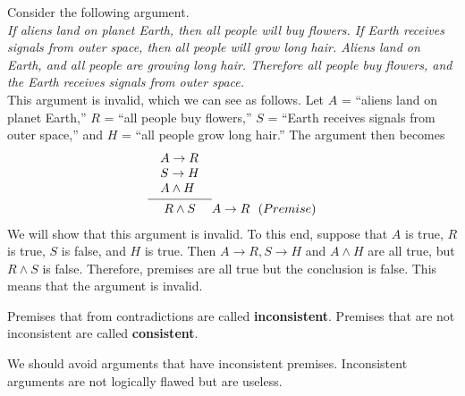\documentclass[]{article}
\begin{document}
\begin{exmp}
Consider the following argument.\\
\emph{
If aliens land on planet Earth, then all people will buy flowers. If Earth receives signals from outer space, then all people will grow long hair. Aliens land on Earth, and all people are growing long hair. Therefore all people buy flowers, and the Earth receives signals from outer space.}\\
			This argument is invalid, which we can see as follows. Let $A$ = ``aliens land on planet Earth,'' $R$ = ``all people buy flowers,'' $S$ = ``Earth receives signals from outer space,'' and $H$ = ``all people grow long hair.'' The argument then becomes
\begin{equation*}
\infer{\begin{array}{@{}llr@{}llr@{}llr@{}}&R \wedge S& \end{array}}{\begin{array}{@{}llr@{}llr@{}llr@{}} &A \rightarrow R&\\&S \rightarrow H&\\&A \wedge H&\end{array}}
    	A \rightarrow R ~~ (Premise)
\end{equation*}
We will show that this argument is invalid. To this end, suppose that $A$ is true, $R$ is true, $S$ is false, and $H$ is true. Then $A \rightarrow R, S\rightarrow H$ and $A \wedge H$ are all true, but $R \wedge S$ is false. Therefore, premises are all true but the conclusion is false. This means that the argument is invalid.	 
\end{exmp}

\begin{defn} Premises that from contradictions are called \textbf{inconsistent}.  Premises that are not inconsistent are called \textbf{consistent}.
\end{defn}
\begin{rem}We should avoid arguments that have inconsistent premises. Inconsistent arguments are not logically flawed but are useless.
\end{rem}
\end{document}
